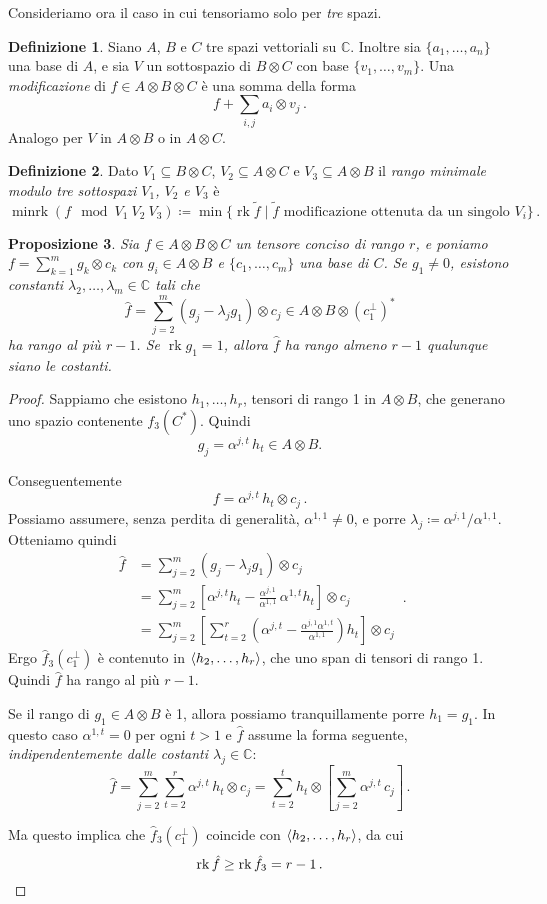 \documentclass[a4paper, 11pt]{article}
\theoremstyle{definition}
\newtheorem{Def}{Definizione}[section]
\theoremstyle{plain}
\newtheorem{Prop}[Def]{Proposizione}
\DeclarePairedDelimiter{\ang}{\langle}{\rangle}
\newcommand{\C}{\mathbb{C}}
\newcommand{\deff}{\coloneqq}
\DeclareMathOperator{\rk}{rk}
\DeclareMathOperator{\minrkop}{minrk}
\newcommand{\minrk}[4]{\minrkop(#1 \!\!\!\mod #2\ #3\ #4)}
\begin{document}
Consideriamo ora il caso in cui tensoriamo solo per \emph{tre} spazi.
\begin{Def}
	Siano $A$, $B$ e $C$ tre spazi vettoriali su $\C$. Inoltre sia $\{a_1, \dots, a_n\}$ una base di $A$, e sia $V$ un sottospazio di $B \otimes C$ con base $\{v_1, \dots, v_m\}$. Una \emph{modificazione} di $f \in A \otimes B \otimes C$ è una somma della forma
	\[
		f + \sum_{i,j} a_i \otimes v_j\,.
	\]
	Analogo per $V$ in $A \otimes B$ o in $A \otimes C$.
\end{Def}
\begin{Def}
	Dato $V_1 \subseteq B \otimes C$, $V_2 \subseteq A \otimes C$ e $V_3 \subseteq A \otimes B$ il \emph{rango minimale modulo tre sottospazi $V_1$, $V_2$ e $V_3$} è 
	\[
		\minrk{f}{V_1}{V_2}{V_3} \deff \min \{\rk \tilde{f} \mid \tilde{f} \text{ modificazione ottenuta da un singolo } V_i\}\,.
	\]
\end{Def}
\begin{Prop}
	Sia $f \in A \otimes B \otimes C$ un tensore conciso di rango $r$, e poniamo $f = \sum_{k=1}^m g_k \otimes c_k$ con $g_i \in A \otimes B$ e $\{c_1, \dots, c_{m}\}$ una base di $C$. Se $g_1 \neq 0$, esistono constanti $\lambda_2, \dots, \lambda_m \in \C$ tali che 
	\[
		\hat{f} = \sum_{j=2}^{m}(g_j - \lambda_j g_1) \otimes  c_j \in A \otimes B \otimes (c_1^\bot)^*
	\]
	ha rango al più $r-1$. Se $\rk g_1 = 1$, allora $\hat{f}$ ha rango almeno $r-1$ qualunque siano le costanti.
\end{Prop}
\begin{proof}
	Sappiamo che esistono $h_1, \dots, h_r$, tensori di rango 1 in $A \otimes B$, che generano uno spazio contenente $f_3(C^*)$. Quindi
	\[
		g_j = \alpha^{j,t}\,h_t \in A \otimes B.
	\]
	
	Conseguentemente
	\[
		f = \alpha^{j,t}\, h_t \otimes  c_j\,.
	\]
	Possiamo assumere, senza perdita di generalità, $\alpha^{1,1} \neq 0$, e porre $\lambda_j \deff \alpha^{j,1}/\alpha^{1,1}$. Otteniamo quindi
	\[
		\begin{split}
			\hat{f} &= \sum_{j=2}^m(g_j - \lambda_jg_1)\otimes c_j\\
			&= \sum_{j=2}^m \left[\alpha^{j,t}h_t - \frac{\alpha^{j,1}}{\alpha^{1,1}}\,\alpha^{1,t}h_t \right]\otimes c_j\\
			&= \sum_{j=2}^m  \left[\sum_{t=2}^r\left( \alpha^{j,t} - \frac{\alpha^{j,1}\alpha^{1,t}}{\alpha^{1,1}}\right)h_t  \right] \otimes c_j
		\end{split}\,.
	\]
	Ergo $\hat{f}_3(c_1^\bot)$ è contenuto in $\ang{h_2, \dots, h_r}$, che uno span di tensori di rango 1. Quindi $\hat{f}$ ha rango al più $r-1$.
	
	Se il rango di $g_1 \in A \otimes B$ è 1, allora possiamo tranquillamente porre $h_1 = g_1$. In questo caso $\alpha^{1,t}= 0$ per ogni $t > 1$ e $\hat{f}$ assume la forma seguente, \emph{indipendentemente dalle costanti $\lambda_j \in \C$}:
	\[
		\hat{f} = \sum_{j=2}^m \sum_{t=2}^r\alpha^{j,t}\,h_t\otimes c_j = \sum_{t = 2}^th_t \otimes \left[\sum_{j=2}^m \alpha^{j,t}\, c_j\right]\,.
	\]
	
	Ma questo implica che $\hat{f}_3(c_1^\bot) $ coincide con $\ang{h_2, \dots, h_r}$, da cui
	\[
		\rk \hat{f} \ge \rk\hat{f}_3 = r-1\,.\qedhere
	\]
\end{proof}
\end{document}
